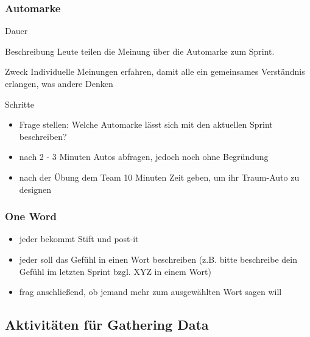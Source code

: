 \subsubsection{Automarke}
\begin{Beschreibungfett}[Beschreibung]
  \item [Dauer]
  \item [Beschreibung] Leute teilen die Meinung über die Automarke zum Sprint.
  \item [Zweck] Individuelle Meinungen erfahren, damit alle ein gemeinsames Verständnis erlangen,
    was andere Denken
  \item [Schritte]
    \begin{itemize}
      \item Frage stellen: Welche Automarke lässt sich mit den aktuellen Sprint beschreiben?
      \item nach 2 - 3 Minuten Autos abfragen, jedoch noch ohne Begründung
      \item nach der Übung dem Team 10 Minuten Zeit geben, um ihr Traum-Auto zu designen
    \end{itemize}
\end{Beschreibungfett}


\subsubsection{One Word}
\begin{itemize}
  \item jeder bekommt Stift und post-it
  \item jeder soll das Gefühl in einen Wort beschreiben (z.B. bitte beschreibe dein Gefühl im
    letzten Sprint bzgl. XYZ in einem Wort)
  \item frag anschließend, ob jemand mehr zum ausgewählten Wort sagen will
\end{itemize}



\subsection{Aktivitäten für Gathering Data}

